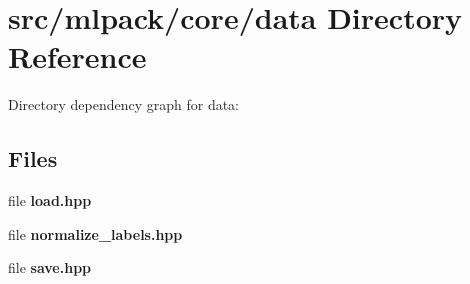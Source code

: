 \section{src/mlpack/core/data Directory Reference}
\label{dir_5c4dbae5150801d2f11765ba3847ed02}
Directory dependency graph for data\-:
\subsection*{Files}
\begin{DoxyCompactItemize}
\item 
file {\bf load.\-hpp}
\item 
file {\bf normalize\-\_\-labels.\-hpp}
\item 
file {\bf save.\-hpp}
\end{DoxyCompactItemize}
